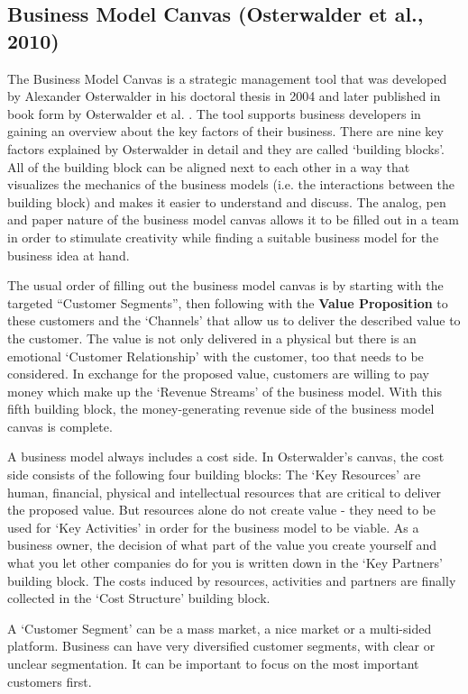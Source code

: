 		

	\subsection{Business Model Canvas (Osterwalder et al., 2010)} 
	\label{sec:bmc}
		The Business Model Canvas is a strategic management tool that was developed by Alexander Osterwalder in his doctoral thesis in 2004 and later published in book form by Osterwalder et al. \cite{osterwalder}. The tool supports business developers in gaining an overview about the key factors of their business. There are nine key factors explained by Osterwalder in detail and they are called `building blocks'. All of the building block can be aligned next to each other in a way that visualizes the mechanics of the business models (i.e. the interactions between the building block) and makes it easier to understand and discuss. The analog, pen and paper nature of the business model canvas allows it to be filled out in a team in order to stimulate creativity while finding a suitable business model for the business idea at hand.

		The usual order of filling out the business model canvas \cite{bmc} is by starting with the targeted ``Customer Segments'', then following with the \textbf{Value Proposition} to these customers and the `Channels' that allow us to deliver the described value to the customer. The value is not only delivered in a physical but there is an emotional `Customer Relationship' with the customer, too that needs to be considered. In exchange for the proposed value, customers are willing to pay money which make up the `Revenue Streams' of the business model. With this fifth building block, the money-generating revenue side of the business model canvas is complete.

		A business model always includes a cost side. In Osterwalder's canvas, the cost side consists of the following four building blocks: The `Key Resources' are human, financial, physical and intellectual resources that are critical to deliver the proposed value. But resources alone do not create value - they need to be used for `Key Activities' in order for the business model to be viable. As a business owner, the decision of what part of the value you create yourself and what you let other companies do for you is written down in the `Key Partners' building block. The costs induced by resources, activities and partners are finally collected in the `Cost Structure' building block.

		A `Customer Segment' can be a mass market, a nice market or a multi-sided platform. Business can have very diversified customer segments, with clear or unclear segmentation. It can be important to focus on the most important customers first.

